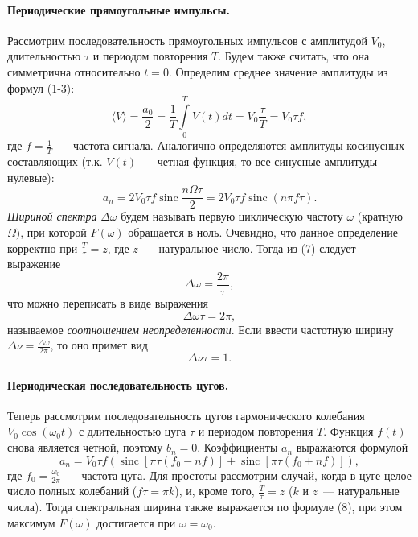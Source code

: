 \documentclass[12pt,a4paper]{article}
\DeclareMathOperator{\sinc}{sinc}
\begin{document}
\paragraph{Периодические прямоугольные импульсы.} Рассмотрим последовательность прямоугольных импульсов с амплитудой $V_0$, длительностью $\tau$ и периодом повторения $T$. Будем также считать, что она симметрична относительно $t=0$. Определим среднее значение амплитуды из формул (1-3):
\begin{equation}
\langle V\rangle = \frac{a_0}{2} = \frac{1}{T}\int\limits_{0}^{T}V(t)dt = V_0\frac{\tau}{T} = V_0\tau f,
\end{equation}
где $f = \frac{1}{T}$~--- частота сигнала. Аналогично определяются амплитуды косинусных составляющих (т.к. $V(t)$~--- четная функция, то все синусные амплитуды нулевые):
\begin{equation}
a_n = 2V_0\tau f\sinc \frac{n\Omega\tau}{2} =2V_0\tau f\sinc(n\pi f\tau).
\end{equation}
\emph{Шириной спектра} $\Delta\omega$ будем называть первую циклическую частоту $\omega$ (кратную $\Omega)$, при которой $F(\omega)$ обращается в ноль. Очевидно, что данное определение корректно при $\frac{T}{\tau} = z$, где $z$~--- натуральное число. Тогда из (7) следует выражение
\begin{equation}
\Delta\omega = \frac{2\pi}{\tau},
\end{equation}
что можно переписать в виде выражения
\begin{equation}
\Delta\omega\tau = 2\pi,
\end{equation}
называемое \emph{соотношением неопределенности}. Если ввести частотную ширину $\Delta\nu = \frac{\Delta\omega}{2\pi}$, то оно примет вид
\begin{equation}
\Delta\nu\tau = 1.
\end{equation}
\paragraph{Периодическая последовательность цугов.} Теперь рассмотрим последовательность цугов гармонического колебания $V_0\cos(\omega_0 t)$ с длительностью цуга $\tau$ и периодом повторения $T$. Функция $f(t)$ снова является четной, поэтому $b_n = 0$. Коэффициенты $a_n$ выражаются формулой
\begin{equation}
a_n = V_0\tau f(\sinc[\pi\tau(f_0 - nf)] + \sinc[\pi\tau(f_0 + nf)]),
\end{equation}
где $f_0 = \frac{\omega_0}{2\pi}$~--- частота цуга. Для простоты рассмотрим случай, когда в цуге целое число полных колебаний ($f\tau = \pi k$), и, кроме того, $\frac{T}{\tau} = z$ ($k$ и $z$~--- натуральные числа). Тогда спектральная ширина также выражается по формуле (8), при этом максимум $F(\omega)$ достигается при $\omega = \omega_0$.
\end{document}
